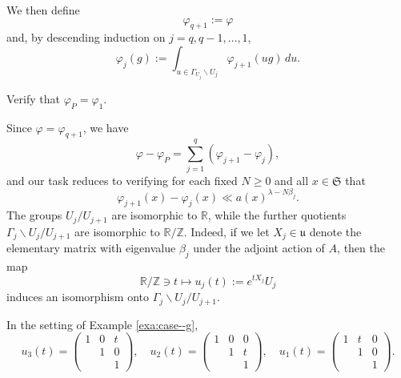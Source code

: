 \documentclass[reqno]{amsart} 
\begin{document}
We then define
\begin{equation*}
  \varphi_{q+1} := \varphi
\end{equation*}
and, by descending induction on $j = q, q-1, \dotsc, 1$,
\begin{equation*}
  \varphi_{j}(g) := \int _{u \in \Gamma_{U_j} \backslash U_j} \varphi_{j+1}(u g) \, d u.
\end{equation*}
\begin{exercise}
  Verify that $\varphi_P = \varphi_1$.
\end{exercise}
Since $\varphi = \varphi_{q+1}$, we have
\begin{equation*}
  \varphi  - \varphi_P = \sum _{j=1}^q (\varphi_{j+1} - \varphi_j),
\end{equation*}
and our task reduces to verifying for each fixed $N \geq 0$ and all $x \in \mathfrak{S}$ that
\begin{equation}\label{eq:varph-varph-ll}
  \varphi_{j+1}(x) - \varphi_j(x) \ll a(x)^{\lambda - N \beta_j}.
\end{equation}
The groups $U_j / U_{j+1}$ are isomorphic to $\mathbb{R}$, while the further quotients $\Gamma_j \backslash U_j / U_{j+1}$ are isomorphic to $\mathbb{R}/\mathbb{Z}$.  Indeed, if we let $X_j \in \mathfrak{u}$ denote the elementary matrix with eigenvalue $\beta_j$ under the adjoint action of $A$, then the map
\begin{equation*}
  \mathbb{R} / \mathbb{Z} \ni t  \mapsto u_j(t) := e^{t X_j}  U_j
\end{equation*}
induces an isomorphism onto $\Gamma_j \backslash U_j / U_{j+1}$.
\begin{example}
  In the setting of Example \ref{exa:case--g},
  \begin{equation*}
    u_3(t) = 
    \begin{pmatrix}
      1 & 0 & t \\
        & 1 & 0 \\
        &  & 1
    \end{pmatrix}
    ,
    \quad
    u_2(t) = 
    \begin{pmatrix}
      1 & 0 & 0 \\
        & 1 & t \\
        &  & 1
    \end{pmatrix}
    ,
    \quad
    u_1(t) = 
    \begin{pmatrix}
      1 & t & 0 \\
        & 1 & 0 \\
        &  & 1
    \end{pmatrix}
    .
  \end{equation*}
\end{example}
\end{document}

